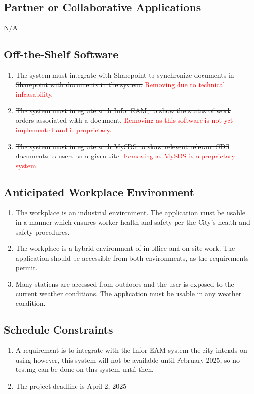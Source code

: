 \documentclass[12pt]{article}
\begin{document}
\subsection{Partner or Collaborative Applications}
N/A
\subsection{Off-the-Shelf Software}
\begin{enumerate} [{C-OTS}1.]
  \item \sout{ The system must integrate with Sharepoint to synchronize documents in
    Sharepoint with documents in the system.} \textcolor{red}{Removing due to technical infeasability.}
  \item \sout{ The system must integrate with Infor EAM, to show the status of work
    orders associated with a document.} \textcolor{red}{Removing as this software is not yet implemented and is proprietary.}
  \item \sout{The system must integrate with MySDS to show relevent relevant SDS
    documents to users on a given site.} \textcolor{red}{Removing as MySDS is a proprietary system.}
\end{enumerate}

\subsection{Anticipated Workplace Environment}
\begin{enumerate} [{C-AWE}1.]
  \item The workplace is an industrial environment. The application must
    be usable in a manner which ensures worker health and safety per the
    City's health and safety procedures.
  \item The workplace is a hybrid environment of in-office and on-site
    work. The application should be accessible from both environments, as
    the requirements permit.
  \item Many stations are accessed from outdoors and the user is exposed to
    the current weather conditions. The application must be usable in any
    weather condition.
\end{enumerate}

\subsection{Schedule Constraints}
\begin{enumerate} [{C-SCH}1.]
  \item A requirement is to integrate with the Infor EAM system the city intends
    on using however, this system will not be available until
    February 2025, so no testing can be done on this system until then.

  \item The project deadline is April 2, 2025.
\end{enumerate}
\end{document}

